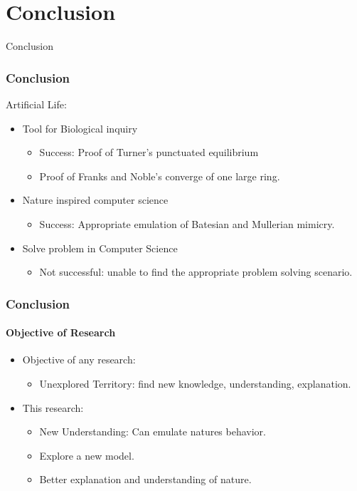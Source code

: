 \section{Conclusion}

\frame
{
	\begin{center}
		\LARGE Conclusion
	\end{center}
}

\frame
{
	\frametitle{Conclusion}
	
	Artificial Life:
	\begin{itemize}
		\item Tool for Biological inquiry
			\begin{itemize}
				\item Success: Proof of Turner's punctuated equilibrium
				\item Proof of Franks and Noble's converge of one large ring.
			\end{itemize}
		\item Nature inspired computer science
			\begin{itemize}
				\item Success: Appropriate emulation of Batesian and Mullerian mimicry.
			\end{itemize}
		\item Solve problem in Computer Science
			\begin{itemize}
				\item Not successful: unable to find the appropriate problem solving scenario.
			\end{itemize}
	\end{itemize}
}

\frame
{
	\frametitle{Conclusion}
	\framesubtitle{Objective of Research}
	
	\begin{itemize}
		\item Objective of any research:
			\begin{itemize}
				\item Unexplored Territory: find new knowledge, understanding, explanation.
			\end{itemize}
		\item This research:
			\begin{itemize}
				\item New Understanding: Can emulate natures behavior.
				\item Explore a new model.
				\item Better explanation and understanding of nature.
			\end{itemize}
	\end{itemize}
}